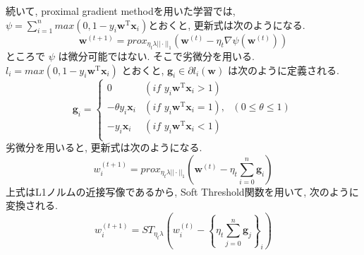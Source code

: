 \documentclass[a4paper,10pt]{jsarticle}
\begin{document}
続いて, proximal gradient methodを用いた学習では,
$\psi = \sum_{i=1}^{n}max(0, 1 - y_i\bm{w}^\mathrm{T}\bm{x}_i)$とおくと,
更新式は次のようになる.
\[
 \bm{w}^{(t+1)} = prox_{\eta_t\lambda||\cdot||_1}\left(\bm{w}^{(t)}
 - \eta_t\nabla\psi(\bm{w}^{(t)})\right)
\]
ところで $\psi$ は微分可能ではない.
そこで劣微分を用いる.
$l_i = max(0, 1 - y_i\bm{w}^\mathrm{T}\bm{x}_i)$ とおくと,
$\bm{g}_i \in \partial l_i(\bm{w})$ は次のように定義される.
\[
  \bm{g}_i = \begin{cases}
              0 &(\mathit{if} \,\, y_i\bm{w}^\mathrm{T}\bm{x}_i > 1)\\
              -\theta y_i\bm{x}_i &(\mathit{if} \,\, y_i\bm{w}^\mathrm{T}\bm{x}_i = 1),
              \,\,\,\,(0 \leq \theta \leq 1)\\
              -y_i\bm{x}_i &(\mathit{if} \,\, y_i\bm{w}^\mathrm{T}\bm{x}_i < 1)\\
             \end{cases}
\]
劣微分を用いると, 更新式は次のようになる.
\[
 w^{(t+1)}_i = prox_{\eta_t\lambda||\cdot||_1}\left(\bm{w}^{(t)}
 - \eta_t\sum_{i=0}^{n}\bm{g}_i\right)
\]
上式はL1ノルムの近接写像であるから, Soft Threshold関数を用いて, 次のように変換される.
\[
 w^{(t+1)}_i = ST_{\eta_t\lambda}\left(
 w^{(t)}_i - \left\{\eta_t\sum_{j=0}^{n}\bm{g}_j\right\}_i\right)
\]
\end{document}
